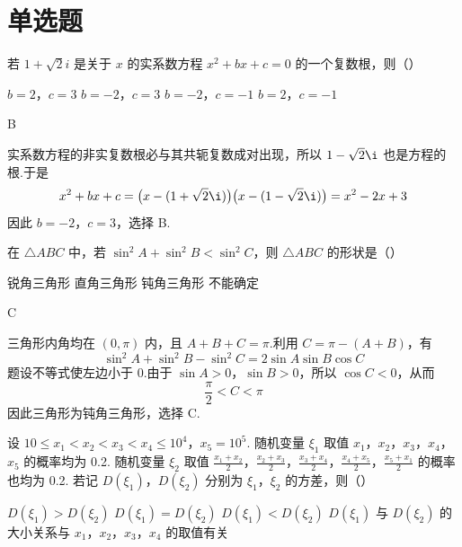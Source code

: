 \section{单选题}

\begin{problem}
若 \(1 + \sqrt{2}i\) 是关于 \(x\) 的实系数方程 \(x^{2} + bx + c = 0\) 的一个复数根，则（\quad）

\choices
    {\(b = 2\)，\(c = 3\)}
    {\(b = -2\)，\(c = 3\)}
    {\(b = -2\)，\(c = -1\)}
    {\(b = 2\)，\(c = -1\)}
\end{problem}

\begin{answer}
B
\end{answer}

\begin{solution}
实系数方程的非实复数根必与其共轭复数成对出现，所以 \(1-\sqrt{2}\i\) 也是方程的根.于是
\[
x^2+bx+c
=\bigl(x-(1+\sqrt{2}\i)\bigr)\bigl(x-(1-\sqrt{2}\i)\bigr)
=x^2-2x+3
\]
因此 \(b=-2\)，\(c=3\)，选择 B.
\end{solution}

\begin{problem}
在 \(\triangle ABC\) 中，若 \(\sin^2 A + \sin^2 B < \sin^2 C\)，则 \(\triangle ABC\) 的形状是（\quad）

\choices
    {锐角三角形}
    {直角三角形}
    {钝角三角形}
    {不能确定}
\end{problem}

\begin{answer}
C
\end{answer}

\begin{solution}
三角形内角均在 \((0,\pi)\) 内，且 \(A+B+C=\pi\).利用 \(C=\pi-(A+B)\)，有
\[
\sin^2 A+\sin^2 B-\sin^2 C
=2\sin A\sin B\cos C
\]
题设不等式使左边小于 \(0\).由于 \(\sin A>0\)，\(\sin B>0\)，所以 \(\cos C<0\)，从而
\[
\frac{\pi}{2}<C<\pi
\]
因此三角形为钝角三角形，选择 C.
\end{solution}

\begin{problem}
设 \(10 \leqslant x_{1} < x_{2} < x_{3} < x_{4} \leqslant 10^{4}\)，\(x_{5} = 10^{5}\). 随机变量 \(\xi_{1}\) 取值 \(x_{1}\)，\(x_{2}\)，\(x_{3}\)，\(x_{4}\)，\(x_{5}\) 的概率均为 0.2. 随机变量 \(\xi_{2}\) 取值 \(\frac{x_{1} + x_{2}}{2}\)，\(\frac{x_{2} + x_{3}}{2}\)，\(\frac{x_{3} + x_{4}}{2}\)，\(\frac{x_{4} + x_{5}}{2}\)，\(\frac{x_{5} + x_{1}}{2}\) 的概率也均为 0.2. 若记 \(D(\xi_{1})\)，\(D(\xi_{2})\) 分别为 \(\xi_{1}\)，\(\xi_{2}\) 的方差，则（\quad）

\choices
    {\(D(\xi_{1}) > D(\xi_{2})\)}
    {\(D(\xi_{1}) = D(\xi_{2})\)}
    {\(D(\xi_{1}) < D(\xi_{2})\)}
    {\(D(\xi_{1})\) 与 \(D(\xi_{2})\) 的大小关系与 \(x_{1}\)，\(x_{2}\)，\(x_{3}\)，\(x_{4}\) 的取值有关}
\end{problem}

